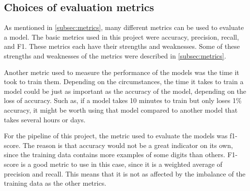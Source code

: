\subsection{Choices of evaluation metrics}\label{subsec:choice-of-evaluation}
As mentioned in \autoref{subsec:metrics}, many different metrics can be used to evaluate a model. The basic metrics used in this project were accuracy, precision, recall, and F1. These metrics each have their strengths and weaknesses. Some of these strengths and weaknesses of the metrics were described in \autoref{subsec:metrics}.

Another metric used to measure the performance of the models was the time it took to train them. Depending on the circumstances, the time it takes to train a model could be just as important as the accuracy of the model, depending on the loss of accuracy. Such as, if a model takes 10 minutes to train but only loses 1\% accuracy, it might be worth using that model compared to another model that takes several hours or days.

For the pipeline of this project, the metric used to evaluate the models was f1-score. The reason is that accuracy would not be a great indicator on its own, since the training data contains more examples of some digits than others. F1-score is a good metric to use in this case, since it is a weighted average of precision and recall. This means that it is not as affected by the imbalance of the training data as the other metrics.